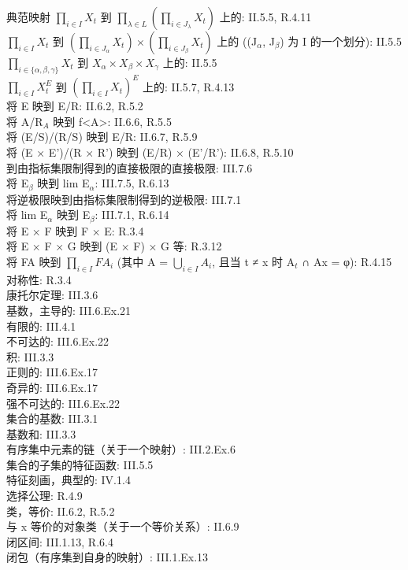 典范映射 \(\prod_{i\in I}X_t\) 到 \(\prod_{\lambda \in L}\left(\prod_{i\in J_\lambda}X_t\right)\) 上的: II.5.5, R.4.11\\
\(\prod_{i\in I}X_t\) 到 \(\left(\prod_{i\in J_\alpha}X_t\right) \times \left(\prod_{i\in J_\beta}X_t\right)\) 上的 ((J\(_\alpha\), J\(_\beta\)) 为 I 的一个划分): II.5.5\\
\(\prod_{i\in \{\alpha,\beta,\gamma\}}X_t\) 到 \(X_\alpha \times X_\beta \times X_\gamma\) 上的: II.5.5\\
\(\prod_{i\in I}X_t^E\) 到 \(\left(\prod_{i\in I}X_t\right)^E\) 上的: II.5.7, R.4.13\\
将 E 映到 E/R: II.6.2, R.5.2\\
将 A/R\(_A\) 映到 f\textless A\textgreater: II.6.6, R.5.5\\
将 (E/S)/(R/S) 映到 E/R: II.6.7, R.5.9\\
将 (E × E')/(R × R') 映到 (E/R) × (E'/R'): II.6.8, R.5.10\\
到由指标集限制得到的直接极限的直接极限: III.7.6\\
将 E\(_\beta\) 映到 lim E\(_\alpha\): III.7.5, R.6.13\\
将逆极限映到由指标集限制得到的逆极限: III.7.1\\
将 lim E\(_\alpha\) 映到 E\(_\beta\): III.7.1, R.6.14\\
将 E × F 映到 F × E: R.3.4\\
将 E × F × G 映到 (E × F) × G 等: R.3.12\\
将 FA 映到 \(\prod_{i\in I}FA_i\) (其中 A = \(\bigcup_{i\in I}A_i\), 且当 t ≠ x 时 A\(_t\) ∩ Ax = φ): R.4.15\\
对称性: R.3.4\\
康托尔定理: III.3.6\\
基数，主导的: III.6.Ex.21\\
有限的: III.4.1\\
不可达的: III.6.Ex.22\\
积: III.3.3\\
正则的: III.6.Ex.17\\
奇异的: III.6.Ex.17\\
强不可达的: III.6.Ex.22\\
集合的基数: III.3.1\\
基数和: III.3.3\\
有序集中元素的链（关于一个映射）: III.2.Ex.6\\
集合的子集的特征函数: III.5.5\\
特征刻画，典型的: IV.1.4\\
选择公理: R.4.9\\
类，等价: II.6.2, R.5.2\\
与 x 等价的对象类（关于一个等价关系）: II.6.9\\
闭区间: III.1.13, R.6.4\\
闭包（有序集到自身的映射）: III.1.Ex.13


